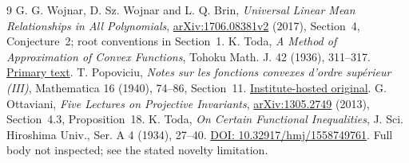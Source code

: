 \documentclass[11pt]{article}
\begin{document}
\clearpage
\begin{thebibliography}{9}
 G. G. Wojnar, D. Sz. Wojnar and L. Q. Brin,
\emph{Universal Linear Mean Relationships in All Polynomials},
\href{https://arxiv.org/abs/1706.08381v2}{arXiv:1706.08381v2} (2017),
Section~4, Conjecture~2; root conventions in Section~1.
 K. Toda, \emph{A Method of Approximation of Convex Functions},
Tohoku Math. J. 42 (1936), 311--317.
\href{https://www.jstage.jst.go.jp/article/tmj1911/42/0/42_0_311/_pdf/-char/en}{Primary text}.
 T. Popoviciu, \emph{Notes sur les fonctions convexes d'ordre
sup\'erieur (III)}, Mathematica 16 (1940), 74--86, Section~11.
\href{https://ictp.acad.ro/notes-on-higher-order-convex-functions-iii/}{Institute-hosted original}.
 G. Ottaviani, \emph{Five Lectures on Projective Invariants},
\href{https://arxiv.org/abs/1305.2749}{arXiv:1305.2749} (2013),
Section~4.3, Proposition~18.
 K. Toda, \emph{On Certain Functional Inequalities},
J. Sci. Hiroshima Univ., Ser. A 4 (1934), 27--40.
\href{https://doi.org/10.32917/hmj/1558749761}{DOI: 10.32917/hmj/1558749761}.
Full body not inspected; see the stated novelty limitation.
\end{thebibliography}
\end{document}

